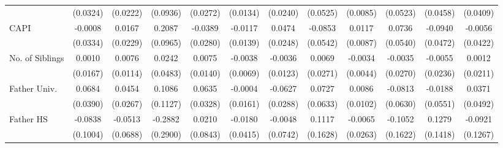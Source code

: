 \begin{table}[htbp]
\begin{tabular}{l*{11}{c}}
            &    (0.0324)         &    (0.0222)         &    (0.0936)         &    (0.0272)         &    (0.0134)         &    (0.0240)         &    (0.0525)         &    (0.0085)         &    (0.0523)         &    (0.0458)         &    (0.0409)         \\
\addlinespace
CAPI        &     -0.0008         &      0.0167         &      0.2087\sym{*}  &     -0.0389         &     -0.0117         &      0.0474         &     -0.0853         &      0.0117         &      0.0736         &     -0.0940\sym{*}  &     -0.0056         \\
            &    (0.0334)         &    (0.0229)         &    (0.0965)         &    (0.0280)         &    (0.0139)         &    (0.0248)         &    (0.0542)         &    (0.0087)         &    (0.0540)         &    (0.0472)         &    (0.0422)         \\
\addlinespace
No. of Siblings&      0.0010         &      0.0076         &      0.0242         &      0.0075         &     -0.0038         &     -0.0036         &      0.0069         &     -0.0034         &     -0.0035         &     -0.0055         &      0.0012         \\
            &    (0.0167)         &    (0.0114)         &    (0.0483)         &    (0.0140)         &    (0.0069)         &    (0.0123)         &    (0.0271)         &    (0.0044)         &    (0.0270)         &    (0.0236)         &    (0.0211)         \\
\addlinespace
Father Univ.&      0.0684         &      0.0454         &      0.1086         &      0.0635         &     -0.0004         &     -0.0627\sym{*}  &      0.0727         &      0.0086         &     -0.0813         &     -0.0188         &      0.0371         \\
            &    (0.0390)         &    (0.0267)         &    (0.1127)         &    (0.0328)         &    (0.0161)         &    (0.0288)         &    (0.0633)         &    (0.0102)         &    (0.0630)         &    (0.0551)         &    (0.0492)         \\
\addlinespace
Father HS   &     -0.0838         &     -0.0513         &     -0.2882         &      0.0210         &     -0.0180         &     -0.0048         &      0.1117         &     -0.0065         &     -0.1052         &      0.1279         &     -0.0921         \\
            &    (0.1004)         &    (0.0688)         &    (0.2900)         &    (0.0843)         &    (0.0415)         &    (0.0742)         &    (0.1628)         &    (0.0263)         &    (0.1622)         &    (0.1418)         &    (0.1267)         \\

\end{tabular}
\end{table}
